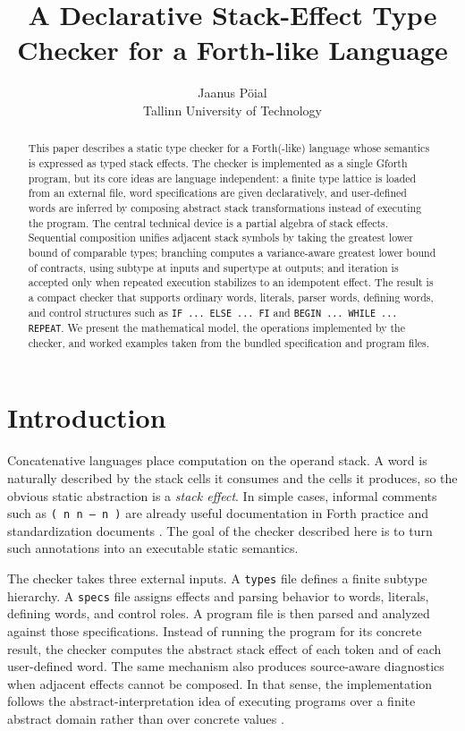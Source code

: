 \documentclass[11pt]{article}
\title{A Declarative Stack-Effect Type Checker for a Forth-like Language}
\author{Jaanus Pöial \\ Tallinn University of Technology}
\date{}
\begin{document}
\maketitle

\begin{abstract}
This paper describes a static type checker for a Forth(-like) language whose semantics is expressed as typed stack effects. The checker is implemented as a single Gforth program, but its core ideas are language independent: a finite type lattice is loaded from an external file, word specifications are given declaratively, and user-defined words are inferred by composing abstract stack transformations instead of executing the program. The central technical device is a partial algebra of stack effects. Sequential composition unifies adjacent stack symbols by taking the greatest lower bound of comparable types; branching computes a variance-aware greatest lower bound of contracts, using subtype at inputs and supertype at outputs; and iteration is accepted only when repeated execution stabilizes to an idempotent effect. The result is a compact checker that supports ordinary words, literals, parser words, defining words, and control structures such as \texttt{IF ... ELSE ... FI} and \texttt{BEGIN ... WHILE ... REPEAT}. We present the mathematical model, the operations implemented by the checker, and worked examples taken from the bundled specification and program files.
\end{abstract}

\section{Introduction}
Concatenative languages place computation on the operand stack. A word is naturally described by the stack cells it consumes and the cells it produces, so the obvious static abstraction is a \emph{stack effect}. In simple cases, informal comments such as \texttt{( n n -- n )} are already useful documentation in Forth practice and standardization documents \cite{rather1996evolution,forth2012standard}. The goal of the checker described here is to turn such annotations into an executable static semantics.

The checker takes three external inputs. A \texttt{types} file defines a finite subtype hierarchy. A \texttt{specs} file assigns effects and parsing behavior to words, literals, defining words, and control roles. A program file is then parsed and analyzed against those specifications. Instead of running the program for its concrete result, the checker computes the abstract stack effect of each token and of each user-defined word. The same mechanism also produces source-aware diagnostics when adjacent effects cannot be composed. In that sense, the implementation follows the abstract-interpretation idea of executing programs over a finite abstract domain rather than over concrete values \cite{cousot1977abstract}.
\end{document}
